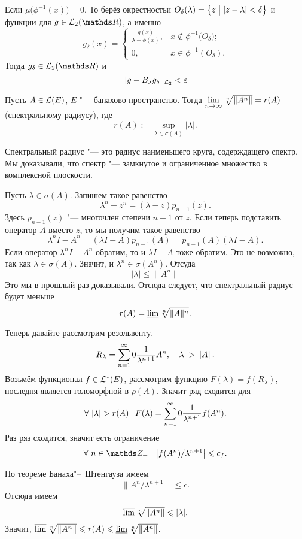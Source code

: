 Если $\mu\big(\phi^{-1}(x)\big)=0$. То берёз окрестностьи $O_\delta(\lambda) = \big\{z\bigm| |z-\lambda|<\delta\big\}$ и функции для $g\in\L_2(\R)$, а именно
\[
  g_\delta(x) = 
\begin{cases}
  \frac{g(x)}{\lambda-\phi(x)},&x\not\in \phi^{-1}\big(O_\delta\big);\\
  0,& x \in\phi^{-1}(O_\delta).
\end{cases}
\]
Тогда  $g_\delta\in\L_2(\R)$ и 
\[
  \|g - B_\lambda g_\delta\|_{\L_2} <\e
\]

\begin{The}
  Пусть $A\in \L(E)$, $E$ "--- банахово пространство. Тогда $\yo n\infty \sqrt[n]{\|A^n\|} = r(A)$ (спектральному радиусу), где 
\[
  r(A) := \sup\limits_{\lambda\in\sigma(A)}|\lambda|.
\]
\end{The}
Спектральный радиус "--- это радиус наименьшего круга, содерждащего спектр. Мы доказывали, что спектр "--- замкнутое и ограниченное множество в комплексной плоскости.

\begin{Proof}
Пусть $\lambda\in\sigma(A)$. Запишем такое равенство
\[
 \lambda^n - z^n = (\lambda-z) p_{n-1}(z).
\]
Здесь $p_{n-1}(z)$ "--- многочлен степени $n-1$ от $z$. Если теперь подставить оператор $A$ вместо $z$, то мы получим такое равенство
\[
  \lambda^n I - A^n = (\lambda I- A)p_{n-1}(A) = p_{n-1}(A) (\lambda I - A).
\]
Если оператор $\lambda^n I - A^n$ обратим, то и $\lambda I - A$ тоже обратим. Это не возможно, так как $\lambda\in\sigma(A)$. Значит, и $\lambda^n\in \sigma(A^n)$. Отсуда
\[
  |\lambda|\le \|A^n\|
\]
Это мы в прошлый раз доказывали. Отсюда следует, что спектральный радиус будет меньше
\[
  r(A) = \varliminf \sqrt[n]{\|A\|^n}.
\]

Теперь давайте рассмотрим резольвенту.
\[
  R_\lambda = \rY n0 \frac1{\lambda^{n+1}} A^n,\pau |\lambda|>\|A\|.
\]
Возьмём функционал $f\in \L^*(E)$, рассмотрим функцию $F(\lambda) = f(R_\lambda)$, последня  является голоморфной в $\rho(A)$. Значит ряд сходится для
\[
  \forall\ |\lambda|>r(A)\pau 
  F(\lambda) = \rY n0\frac1{\lambda^{n+1}} f(A^n).
\]
Раз ряз сходится, значит есть ограничение
\[
  \forall\ n\in \Z_+\pau \left|f(A^n)/\lambda^{n+1}\right|\le c_f.
\]

По теореме Банаха"--~Штенгауза имеем
\[
  \|A^n/\lambda^{n+1}\|\le c.
\]
Отсюда имеем
\[
  \varlimsup\sqrt[n]{\|A^n\|}\le |\lambda|.
\]
Значит, $\varlimsup\sqrt[n]{\|A^n\|}\le r(A)\le \varliminf\sqrt[n]{\|A^n\|}$.
\end{Proof}

